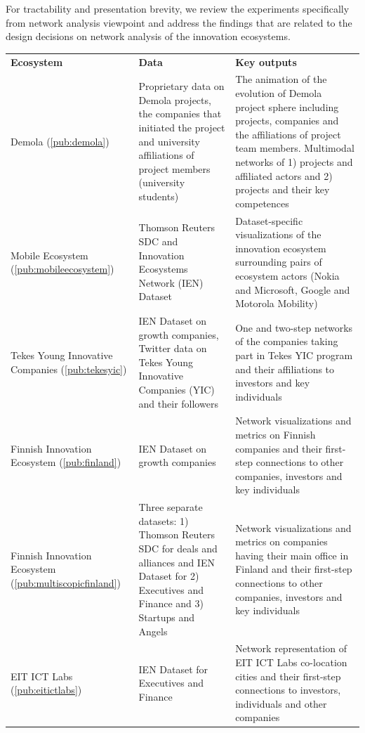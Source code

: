For tractability and presentation brevity, we review the experiments specifically from network analysis viewpoint and address the findings that are related to the design decisions on network analysis of the innovation ecosystems.

\begingroup
{}\label{tab:experiments}
\begin{tabular}{p{2.5cm} p{4cm} p{5.5cm}}
\textbf{Ecosystem} 
& \textbf{Data} 
& \textbf{Key outputs} \\

Demola (\ref{pub:demola}) &
Proprietary data on Demola projects, the companies that initiated the project and university affiliations of project members (university students) & 
The animation of the evolution of Demola project sphere including projects, companies and the affiliations of project team members. Multimodal networks of 1) projects and affiliated actors and 2) projects and their key competences \\

Mobile Ecosystem (\ref{pub:mobileecosystem}) &
Thomson Reuters SDC and Innovation Ecosystems Network (IEN) Dataset  & 
Dataset-specific visualizations of the innovation ecosystem surrounding pairs of ecosystem actors (Nokia and Microsoft, Google and Motorola Mobility) \\

Tekes Young Innovative Companies (\ref{pub:tekesyic})  &
IEN Dataset on growth companies, Twitter data on Tekes Young Innovative Companies (YIC) and their followers & 
One and two-step networks of the companies taking part in Tekes YIC program and their affiliations to investors and key individuals \\

Finnish Innovation Ecosystem (\ref{pub:finland}) & 
IEN Dataset on growth companies & 
Network visualizations and metrics on Finnish companies and their first-step connections to other companies, investors and key individuals \\

Finnish Innovation Ecosystem (\ref{pub:multiscopicfinland}) & 
Three separate datasets: 1) Thomson Reuters SDC for deals and alliances and IEN Dataset for 2) Executives and Finance and 3) Startups and Angels & 
Network visualizations and metrics on companies having their main office in Finland and their first-step connections to other companies, investors and key individuals \\

EIT ICT Labs (\ref{pub:eitictlabs}) & 
IEN Dataset for Executives and Finance	& 
Network representation of EIT ICT Labs co-location cities and their first-step connections to investors, individuals and other companies
\end{tabular}
